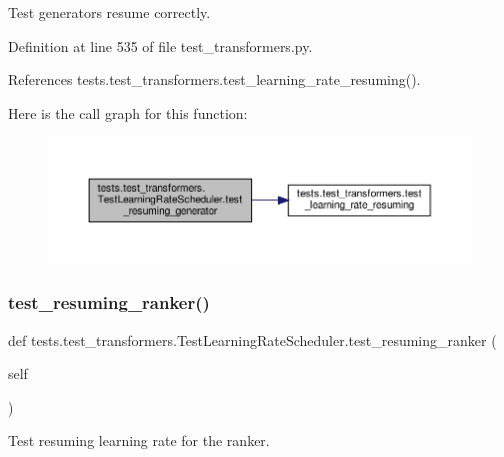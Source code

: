 \begin{DoxyVerb}Test generators resume correctly.\end{DoxyVerb}
 

Definition at line 535 of file test\+\_\+transformers.\+py.



References tests.\+test\+\_\+transformers.\+test\+\_\+learning\+\_\+rate\+\_\+resuming().

Here is the call graph for this function\+:
\nopagebreak
\begin{figure}[H]
\begin{center}
\leavevmode
\includegraphics[width=350pt]{classtests_1_1test__transformers_1_1TestLearningRateScheduler_a8c89a354321034bd5717b8e1907cbfeb_cgraph}
\end{center}
\end{figure}
\mbox{\label{classtests_1_1test__transformers_1_1TestLearningRateScheduler_a1f6f7d394258d2170c3005e6dffae8a7}} 
\subsubsection{\texorpdfstring{test\+\_\+resuming\+\_\+ranker()}{test\_resuming\_ranker()}}
{\footnotesize\ttfamily def tests.\+test\+\_\+transformers.\+Test\+Learning\+Rate\+Scheduler.\+test\+\_\+resuming\+\_\+ranker (\begin{DoxyParamCaption}\item[{}]{self }\end{DoxyParamCaption})}

\begin{DoxyVerb}Test resuming learning rate for the ranker.\end{DoxyVerb}
 

